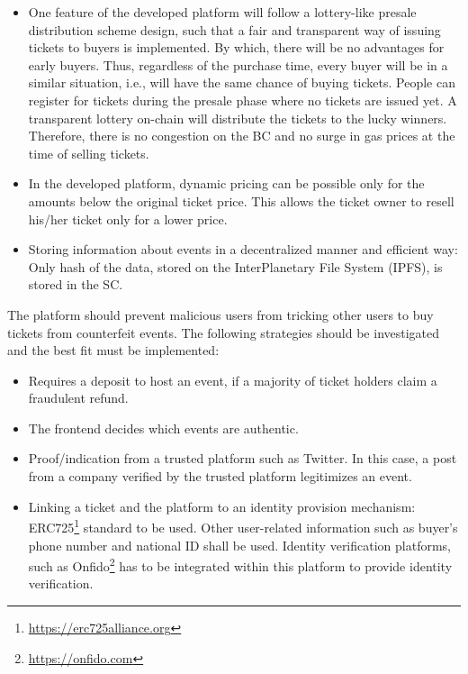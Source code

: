 \begin{itemize}
    \item One feature of the developed platform will follow a lottery-like presale distribution scheme design, such that a fair and transparent way of issuing tickets to buyers is implemented. By which, there will be no advantages for early buyers. Thus, regardless of the purchase time, every buyer will be in a similar situation, i.e., will have the same chance of buying tickets. People can register for tickets during the presale phase where no tickets are issued yet. A transparent lottery on-chain will distribute the tickets to the lucky winners. Therefore, there is no congestion on the BC and no surge in gas prices at the time of selling tickets.
    \item In the developed platform, dynamic pricing can be possible only for the amounts below the original ticket price. This allows the ticket owner to resell his/her ticket only for a lower price.
    \item Storing information about events in a decentralized manner and efficient way: Only hash of the data, stored on the InterPlanetary File System (IPFS), is stored in the SC.
\end{itemize}


The platform should prevent malicious users from tricking other users to buy tickets from counterfeit events. The following strategies should be investigated and the best fit must be implemented:  
\begin{itemize}
    \item Requires a deposit to host an event, if a majority of ticket holders claim a fraudulent refund.
    \item The frontend decides which events are authentic.
    \item Proof/indication from a trusted platform such as Twitter. In this case, a post from a company verified by the trusted platform legitimizes an event.
    \item Linking a ticket and the platform to an identity provision mechanism: ERC725\footnote{\href{https://erc725alliance.org}{https://erc725alliance.org}} standard to be used. Other user-related information such as buyer's phone number and national ID shall be used. Identity verification platforms, such as Onfido\footnote{\href{https://onfido.com}{https://onfido.com}} has to be integrated within this platform to provide identity verification.
\end{itemize}

